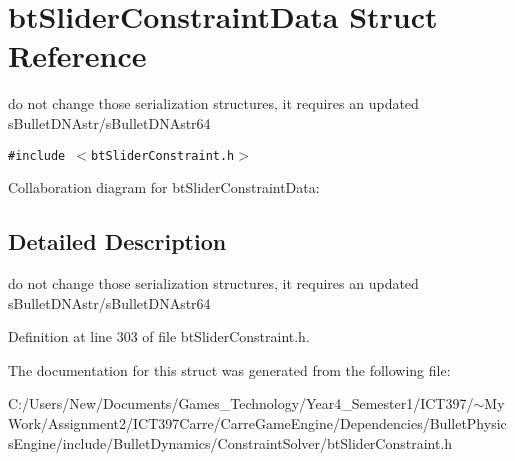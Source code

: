 \hypertarget{structbt_slider_constraint_data}{
\section{btSliderConstraintData Struct Reference}
\label{structbt_slider_constraint_data}
}
do not change those serialization structures, it requires an updated sBulletDNAstr/sBulletDNAstr64  


{\tt \#include $<$btSliderConstraint.h$>$}

Collaboration diagram for btSliderConstraintData:

\subsection{Detailed Description}
do not change those serialization structures, it requires an updated sBulletDNAstr/sBulletDNAstr64 

Definition at line 303 of file btSliderConstraint.h.

The documentation for this struct was generated from the following file:\begin{CompactItemize}
\item 
C:/Users/New/Documents/Games\_\-Technology/Year4\_\-Semester1/ICT397/$\sim$My Work/Assignment2/ICT397Carre/CarreGameEngine/Dependencies/BulletPhysicsEngine/include/BulletDynamics/ConstraintSolver/btSliderConstraint.h\end{CompactItemize}
